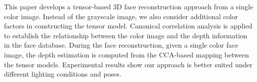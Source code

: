 This paper develops a tensor-based 3D face reconstruction approach from a single color image. Instead of the grayscale image, we also consider additional color factors in constructing the tensor model. Canonical correlation analysis is applied to establish the relationship between the color image and the depth information in the face database. During the face reconstruction, given a single color face image, the depth estimation is computed from the CCA-based mapping between the tensor models. Experimental results show our approach is better suited under different lighting conditions and poses.